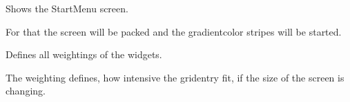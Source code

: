 \documentclass[letterpaper,10pt,english]{sphinxmanual}
\begin{document}
\begin{fulllineitems}

\begin{fulllineitems}
\label{\detokenize{anoog.automation:anoog.automation.graphical_user_interface.Menu.show}}
\sphinxAtStartPar
Shows the Start\sphinxhyphen{}Menu screen.

\sphinxAtStartPar
For that the screen will be packed and the gradient\sphinxhyphen{}color stripes will be started.

\end{fulllineitems}


\begin{fulllineitems}
\label{\detokenize{anoog.automation:anoog.automation.graphical_user_interface.Menu.weighting}}
\sphinxAtStartPar
Defines all weightings of the widgets.

\sphinxAtStartPar
The weighting defines, how intensive the grid\sphinxhyphen{}entry fit, if the size of the screen is changing.

\end{fulllineitems}


\end{fulllineitems}

\end{document}

